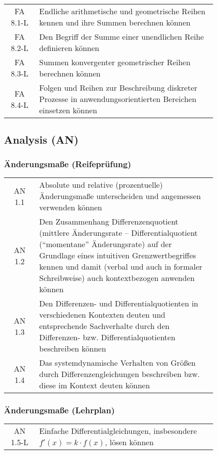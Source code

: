 \documentclass[a4paper,12pt]{article}
\begin{document}
\begin{em}
\begin{tabular}{cp{0.85\linewidth}}
FA 8.1-L & Endliche arithmetische und geometrische Reihen kennen und ihre Summen berechnen können\\
FA 8.2-L & Den Begriff der Summe einer unendlichen Reihe definieren können\\
FA 8.3-L & Summen konvergenter geometrischer Reihen berechnen können\\
FA 8.4-L & Folgen und Reihen zur Beschreibung diskreter Prozesse in anwendungsorientierten Bereichen einsetzen können\\
\end{tabular}

\end{em}

\newpage

\subsection{Analysis (AN)}

\subsubsection{Änderungsmaße (Reifeprüfung)}
\begin{tabular}{cp{0.85\linewidth}}
AN 1.1 & Absolute und relative (prozentuelle) Änderungsmaße unterscheiden und angemessen verwenden können\\
AN 1.2 & Den Zusammenhang Differenzenquotient (mittlere Änderungsrate – Differentialquotient ("`momentane"' Änderungsrate) auf der Grundlage eines intuitiven Grenzwertbegriffes kennen und damit (verbal und auch in formaler Schreibweise) auch kontextbezogen anwenden können\\
AN 1.3 & Den Differenzen- und Differentialquotienten in verschiedenen Kontexten deuten und entsprechende Sachverhalte durch den Differenzen- bzw. Differentialquotienten beschreiben können\\
AN 1.4 & Das systemdynamische Verhalten von Größen durch Differenzengleichungen beschreiben bzw. diese im Kontext deuten können \\
\end{tabular}

\subsubsection{Änderungsmaße (Lehrplan)}
\begin{em}
\begin{tabular}{cp{0.85\linewidth}}
AN 1.5-L & Einfache Differentialgleichungen, insbesondere $f'(x)= k\cdot f(x)$, lösen können\\
\end{tabular}
\end{em}
\end{document}
